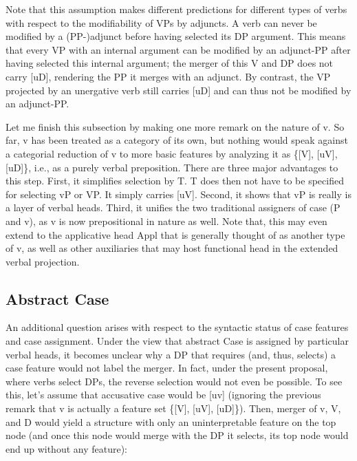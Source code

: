 \documentclass[output=paper
,modfonts
,nonflat]{langsci/langscibook}
\begin{document}
Note that this assumption makes different predictions for different types of verbs with respect to the modifiability of VPs by adjuncts. A verb can never be modified by a (PP-)adjunct before having selected its DP argument. This means that every VP with an internal argument can be modified by an adjunct-PP after having selected this internal argument; the merger of this V and DP does not carry [uD], rendering the PP it merges with an adjunct. By contrast, the VP projected by an unergative verb still carries [uD] and can thus not be modified by an adjunct-PP. 

Let me finish this subsection by making one more remark on the nature of v. So far, v has been treated as a category of its own, but nothing would speak against a categorial reduction of v to more basic features by analyzing it as \{[V], [uV], [uD]\}, i.e., as a purely verbal preposition. There are three major advantages to this step. First, it simplifies selection by T. T does then not have to be specified for selecting vP or VP. It simply carries [uV]. Second, it shows that vP is really is a layer of verbal heads. Third, it unifies the two traditional assigners of case (P and v), as v is now prepositional in nature as well. Note that, this may even extend to the applicative head Appl that is generally thought of as another type of v, as well as other auxiliaries that may host functional head in the extended verbal projection.

\subsection{Abstract Case}
An additional question arises with respect to the syntactic status of case features and case assignment. Under the view that abstract Case is assigned by particular verbal heads, it becomes unclear why a DP that requires (and, thus, selects) a case feature would not label the merger. In fact, under the present proposal, where verbs select DPs, the reverse selection would not even be possible. To see this, let’s assume that accusative case would be [uv] (ignoring the previous remark that v is actually a feature set \{[V], [uV], [uD]\}). Then, merger of v, V, and D would yield a structure with only an uninterpretable feature on the top node (and once this node would merge with the DP it selects, its top node would end up without any feature):
\end{document}
